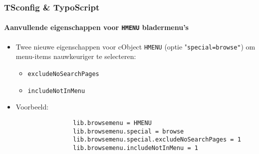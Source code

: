 
\begin{frame}[fragile]
	\frametitle{TSconfig \& TypoScript}
	\framesubtitle{Aanvullende eigenschappen voor \texttt{HMENU} bladermenu's}

	\begin{itemize}
		\item Twee nieuwe eigenschappen voor cObject \texttt{HMENU} (optie "\texttt{special=browse"})
			om menu-items nauwkeuriger te selecteren:
		
			\begin{itemize}
				\item \texttt{excludeNoSearchPages}
				\item \texttt{includeNotInMenu}
			\end{itemize}

		\item Voorbeeld:

			\begin{lstlisting}
				lib.browsemenu = HMENU
				lib.browsemenu.special = browse
				lib.browsemenu.special.excludeNoSearchPages = 1
				lib.browsemenu.includeNotInMenu = 1
			\end{lstlisting}

	\end{itemize}

\end{frame}


